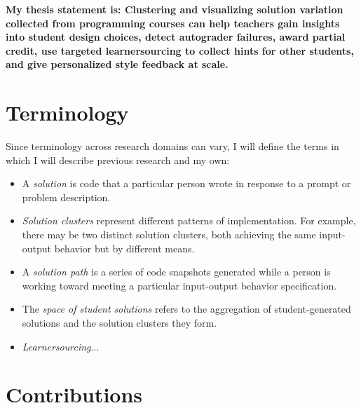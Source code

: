 {\bf My thesis statement is: Clustering and visualizing solution variation collected from programming courses can help teachers gain insights into student design choices, detect autograder failures, award partial credit, use targeted learnersourcing  to collect hints for other students, and give personalized style feedback at scale.}

\section{Terminology}


Since terminology across research domains can vary, I will define the terms in which I will describe previous research and my own: 
\begin{itemize}
\item A {\it solution} is code that a particular person wrote in response to a prompt or problem description.
\item {\it Solution clusters} represent different patterns of implementation. For example, there may be two distinct solution clusters, both achieving the same input-output behavior but by different means. 
\item A {\it solution path} is a series of code snapshots generated while a person is working toward meeting a particular input-output behavior specification. 
\item The {\it space of student solutions} refers to the aggregation of student-generated solutions and the solution clusters they form.
\item {\it Learnersourcing}... 
\end{itemize}

\section{Contributions}

